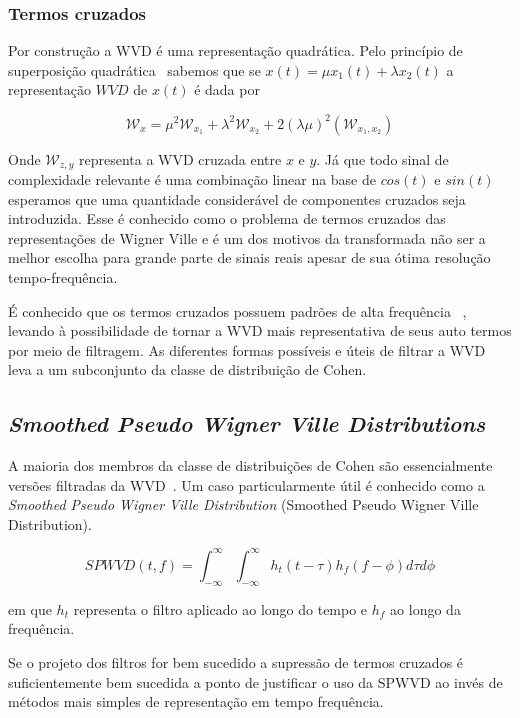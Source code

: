\subsubsection{Termos cruzados}

Por construção a WVD é uma representação quadrática. Pelo princípio de
superposição quadrática~\cite{quadratic_freq_representation} sabemos que se
$x(t) = \mu x_1(t) + \lambda x_2(t)$ a representação $WVD$ de $x(t)$ é dada
por

$$ \mathcal{W}_{x} = \mu^2\mathcal{W}_{x_1} + \lambda^2\mathcal{W}_{x_2} + 2(\lambda\mu)^2(\mathcal{W}_{x_1 , x_2}) $$

Onde $\mathcal{W}_{z, y}$ representa a WVD cruzada entre $x$ e $y$. Já que todo
sinal de complexidade relevante é uma combinação linear na base de $cos(t)$ e
$sin(t)$ esperamos que uma quantidade considerável de componentes cruzados seja
introduzida. Esse é conhecido como o problema de termos cruzados das
representações de Wigner Ville e é um dos motivos da transformada não ser a
melhor escolha para grande parte de sinais reais apesar de sua ótima resolução
tempo-frequência.

É conhecido que os termos cruzados possuem padrões de alta frequência
~\cite{martinez}, levando à possibilidade de tornar a WVD mais representativa
de seus auto termos por meio de filtragem. As diferentes formas possíveis e
úteis de filtrar a WVD leva a um subconjunto da classe de distribuição de
Cohen.

\subsection{\emph{Smoothed Pseudo Wigner Ville Distributions}}

A maioria dos membros da classe de distribuições de Cohen são essencialmente
versões filtradas da WVD~\cite{tfr_comparison}. Um caso particularmente útil
é conhecido como a \emph{Smoothed Pseudo Wigner Ville Distribution}
(Smoothed Pseudo Wigner Ville Distribution).

$$ SPWVD(t, f) = \int_{-\infty}^{\infty}\int_{-\infty}^{\infty} h_t (t - \tau) h_f(f - \phi)d\tau d\phi $$

em que $h_t$ representa o filtro aplicado ao longo do tempo e $h_f$ ao longo
da frequência.

Se o projeto dos filtros for bem sucedido a supressão de termos cruzados é
suficientemente bem sucedida a ponto de justificar o uso da SPWVD ao invés de
métodos mais simples de representação em tempo frequência.
